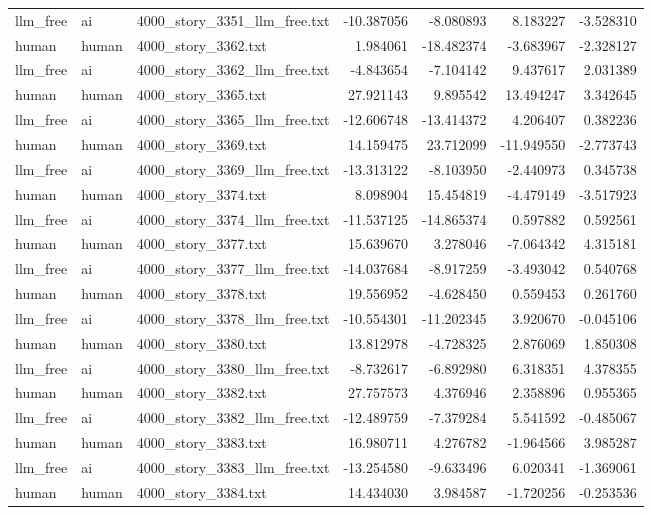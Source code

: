 \begin{longtable}{lllrrrr}
llm\_free & ai & 4000\_story\_3351\_llm\_free.txt & -10.387056 & -8.080893 & 8.183227 & -3.528310 \\
human & human & 4000\_story\_3362.txt & 1.984061 & -18.482374 & -3.683967 & -2.328127 \\
llm\_free & ai & 4000\_story\_3362\_llm\_free.txt & -4.843654 & -7.104142 & 9.437617 & 2.031389 \\
human & human & 4000\_story\_3365.txt & 27.921143 & 9.895542 & 13.494247 & 3.342645 \\
llm\_free & ai & 4000\_story\_3365\_llm\_free.txt & -12.606748 & -13.414372 & 4.206407 & 0.382236 \\
human & human & 4000\_story\_3369.txt & 14.159475 & 23.712099 & -11.949550 & -2.773743 \\
llm\_free & ai & 4000\_story\_3369\_llm\_free.txt & -13.313122 & -8.103950 & -2.440973 & 0.345738 \\
human & human & 4000\_story\_3374.txt & 8.098904 & 15.454819 & -4.479149 & -3.517923 \\
llm\_free & ai & 4000\_story\_3374\_llm\_free.txt & -11.537125 & -14.865374 & 0.597882 & 0.592561 \\
human & human & 4000\_story\_3377.txt & 15.639670 & 3.278046 & -7.064342 & 4.315181 \\
llm\_free & ai & 4000\_story\_3377\_llm\_free.txt & -14.037684 & -8.917259 & -3.493042 & 0.540768 \\
human & human & 4000\_story\_3378.txt & 19.556952 & -4.628450 & 0.559453 & 0.261760 \\
llm\_free & ai & 4000\_story\_3378\_llm\_free.txt & -10.554301 & -11.202345 & 3.920670 & -0.045106 \\
human & human & 4000\_story\_3380.txt & 13.812978 & -4.728325 & 2.876069 & 1.850308 \\
llm\_free & ai & 4000\_story\_3380\_llm\_free.txt & -8.732617 & -6.892980 & 6.318351 & 4.378355 \\
human & human & 4000\_story\_3382.txt & 27.757573 & 4.376946 & 2.358896 & 0.955365 \\
llm\_free & ai & 4000\_story\_3382\_llm\_free.txt & -12.489759 & -7.379284 & 5.541592 & -0.485067 \\
human & human & 4000\_story\_3383.txt & 16.980711 & 4.276782 & -1.964566 & 3.985287 \\
llm\_free & ai & 4000\_story\_3383\_llm\_free.txt & -13.254580 & -9.633496 & 6.020341 & -1.369061 \\
human & human & 4000\_story\_3384.txt & 14.434030 & 3.984587 & -1.720256 & -0.253536 \\

\end{longtable}
